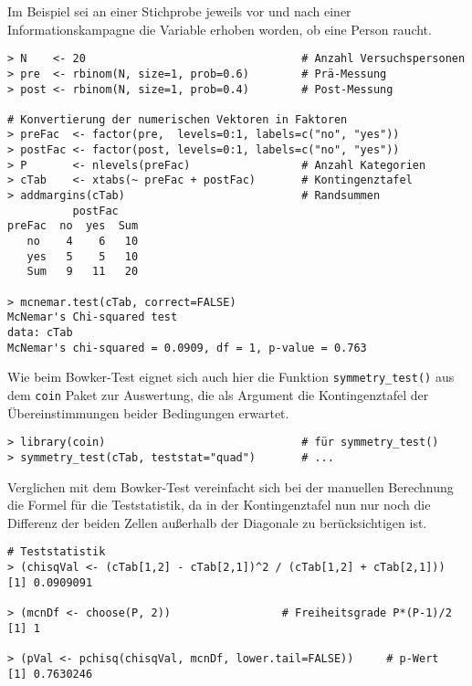 Im Beispiel sei an einer Stichprobe jeweils vor und nach einer Informationskampagne die Variable erhoben worden, ob eine Person raucht.
\begin{lstlisting}
> N    <- 20                                 # Anzahl Versuchspersonen
> pre  <- rbinom(N, size=1, prob=0.6)        # Prä-Messung
> post <- rbinom(N, size=1, prob=0.4)        # Post-Messung

# Konvertierung der numerischen Vektoren in Faktoren
> preFac  <- factor(pre,  levels=0:1, labels=c("no", "yes"))
> postFac <- factor(post, levels=0:1, labels=c("no", "yes"))
> P       <- nlevels(preFac)                 # Anzahl Kategorien
> cTab    <- xtabs(~ preFac + postFac)       # Kontingenztafel
> addmargins(cTab)                           # Randsummen
          postFac
preFac  no  yes  Sum
   no    4    6   10
   yes   5    5   10
   Sum   9   11   20

> mcnemar.test(cTab, correct=FALSE)
McNemar's Chi-squared test
data: cTab
McNemar's chi-squared = 0.0909, df = 1, p-value = 0.763
\end{lstlisting}

Wie beim Bowker-Test eignet sich auch hier die Funktion \lstinline!symmetry_test()! aus dem \lstinline!coin! Paket zur Auswertung, die als Argument die Kontingenztafel der Übereinstimmungen beider Bedingungen erwartet.
\begin{lstlisting}
> library(coin)                              # für symmetry_test()
> symmetry_test(cTab, teststat="quad")       # ...
\end{lstlisting}

Verglichen mit dem Bowker-Test vereinfacht sich bei der manuellen Berechnung die Formel für die Teststatistik, da in der Kontingenztafel nun nur noch die Differenz der beiden Zellen außerhalb der Diagonale zu berücksichtigen ist.
\begin{lstlisting}
# Teststatistik
> (chisqVal <- (cTab[1,2] - cTab[2,1])^2 / (cTab[1,2] + cTab[2,1]))
[1] 0.0909091

> (mcnDf <- choose(P, 2))                 # Freiheitsgrade P*(P-1)/2
[1] 1

> (pVal <- pchisq(chisqVal, mcnDf, lower.tail=FALSE))     # p-Wert
[1] 0.7630246
\end{lstlisting}

